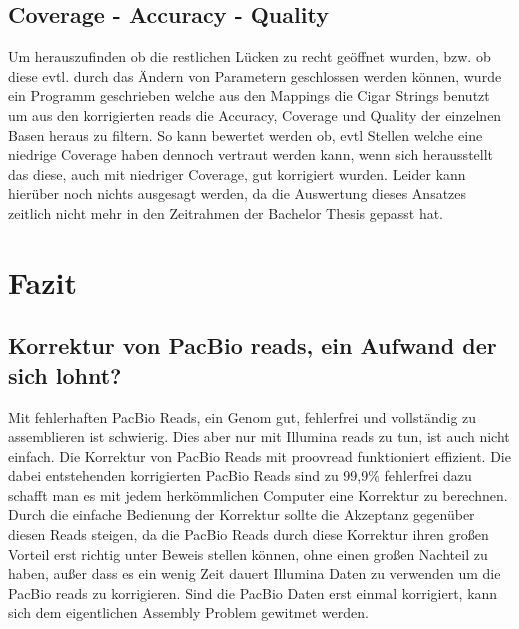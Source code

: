 \documentclass{scrartcl}
\begin{document}
\subsection{Coverage - Accuracy - Quality}
\label{sec-8-3}
Um herauszufinden ob die restlichen Lücken zu recht geöffnet wurden, bzw. ob diese evtl. durch das Ändern von Parametern geschlossen werden können, wurde ein Programm
geschrieben welche aus den Mappings die Cigar Strings benutzt um aus den korrigierten reads die Accuracy, Coverage und Quality der einzelnen Basen heraus zu filtern.
So kann bewertet werden ob, evtl Stellen welche eine niedrige Coverage haben dennoch vertraut werden kann, wenn sich herausstellt das diese, auch mit niedriger Coverage,
gut korrigiert wurden. Leider kann hierüber noch nichts ausgesagt werden, da die Auswertung dieses Ansatzes zeitlich nicht mehr in den Zeitrahmen der Bachelor Thesis gepasst hat.
\clearpage


\section{Fazit}
\label{sec-9}
\subsection{Korrektur von PacBio reads, ein Aufwand der sich lohnt?}
\label{sec-9-1}
Mit fehlerhaften PacBio Reads, ein Genom gut, fehlerfrei und vollständig zu assemblieren ist schwierig. Dies aber nur mit Illumina reads zu tun, ist auch
nicht einfach. Die Korrektur von PacBio Reads mit proovread funktioniert effizient. Die dabei entstehenden korrigierten PacBio Reads sind zu 99,9\% fehlerfrei
dazu schafft man es mit jedem herkömmlichen Computer eine Korrektur zu berechnen. 
Durch die einfache Bedienung der Korrektur sollte die Akzeptanz gegenüber diesen Reads steigen, da die PacBio Reads durch diese Korrektur ihren großen Vorteil erst richtig
unter Beweis stellen können, ohne einen großen Nachteil zu haben, außer dass es ein wenig Zeit dauert Illumina Daten zu verwenden um
die PacBio reads zu korrigieren. 
Sind die PacBio Daten erst einmal korrigiert, kann sich dem eigentlichen Assembly Problem gewitmet werden. 
\end{document}
